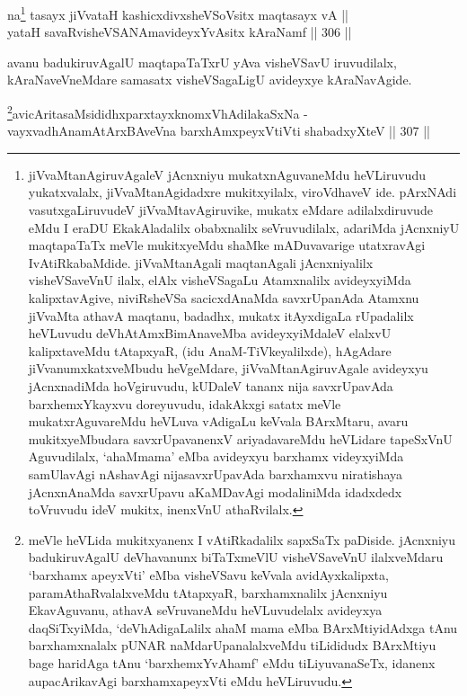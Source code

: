 \begin{shl}
na\footnote{jiVvaMtanAgiruvAgaleV jAcnxniyu mukatxnAguvaneMdu
heVLiruvudu yukatxvalalx, jiVvaMtanAgidadxre mukitxyilalx,
viroVdhaveV ide. pArxNAdi vasutxgaLiruvudeV jiVvaMtavAgiruvike,
mukatx eMdare adilalxdiruvude eMdu I eraDU EkakAladalilx obabxnalilx
seVruvudilalx, adariMda jAcnxniyU maqtapaTaTx meVle mukitxyeMdu
shaMke mADuvavarige utatxravAgi IvAtiRkabaMdide. jiVvaMtanAgali
maqtanAgali jAcnxniyalilx visheVSaveVnU ilalx, elAlx visheVSagaLu
Atamxnalilx avideyxyiMda kalipxtavAgive, niviRsheVSa sacicxdAnaMda
savxrUpanAda Atamxnu jiVvaMta athavA maqtanu, badadhx, mukatx
itAyxdigaLa rUpadalilx heVLuvudu deVhAtAmxBimAnaveMba
avideyxyiMdaleV elalxvU kalipxtaveMdu tAtapxyaR, (idu
AnaM-TiVkeyalilxde), hAgAdare jiVvanumxkatxveMbudu heVgeMdare,
jiVvaMtanAgiruvAgale avideyxyu jAcnxnadiMda hoVgiruvudu, kUDaleV
tananx nija savxrUpavAda barxhemxYkayxvu doreyuvudu, idakAkxgi
satatx meVle mukatxrAguvareMdu heVLuva vAdigaLu keVvala BArxMtaru,
avaru mukitxyeMbudara savxrUpavanenxV ariyadavareMdu heVLidare
tapeSxVnU Aguvudilalx, `ahaMmama' eMba avideyxyu barxhamx
videyxyiMda samUlavAgi nAshavAgi nijasavxrUpavAda barxhamxvu
niratishaya jAcnxnAnaMda savxrUpavu aKaMDavAgi modaliniMda idadxdedx
toVruvudu ideV mukitx, inenxVnU athaRvilalx.} tasayx jiVvataH kashicxdivxsheVSoV\s sitx maqtasayx vA || \\
yataH savaRvisheVSANAmavideyxYvAsitx kAraNamf \hfill || 306 ||  
\end{shl}

\begin{artha}
avanu badukiruvAgalU maqtapaTaTxrU yAva visheVSavU
iruvudilalx, kAraNaveVneMdare samasatx visheVSagaLigU avideyxye kAraNavAgide.
\end{artha}


\begin{shl}
\footnote{meVle heVLida mukitxyanenx I vAtiRkadalilx sapxSaTx
paDiside. jAcnxniyu badukiruvAgalU deVhavanunx biTaTxmeVlU
visheVSaveVnU ilalxveMdaru `barxhamx apeyxVti' eMba visheVSavu
keVvala avidAyxkalipxta, paramAthaRvalalxveMdu tAtapxyaR,
barxhamxnalilx jAcnxniyu EkavAguvanu, athavA seVruvaneMdu
heVLuvudelalx avideyxya daqSiTxyiMda, `deVhAdigaLalilx ahaM mama
eMba BArxMtiyidAdxga tAnu barxhamxnalalx pUNAR naMdarUpanalalxveMdu
tiLididudx BArxMtiyu bage haridAga tAnu `barxhemxYvAhamf' eMdu
tiLiyuvanaSeTx, idanenx aupacArikavAgi barxhamxapeyxVti eMdu
heVLiruvudu.}avicAritasaMsididhxparxtayxknomxVhAdilakaSxNa - \\
vayxvadhAnamAtArxBAveVna barxhAmxpeyxVtiVti shabadxyXteV \hfill || 307 ||  
\end{shl}

